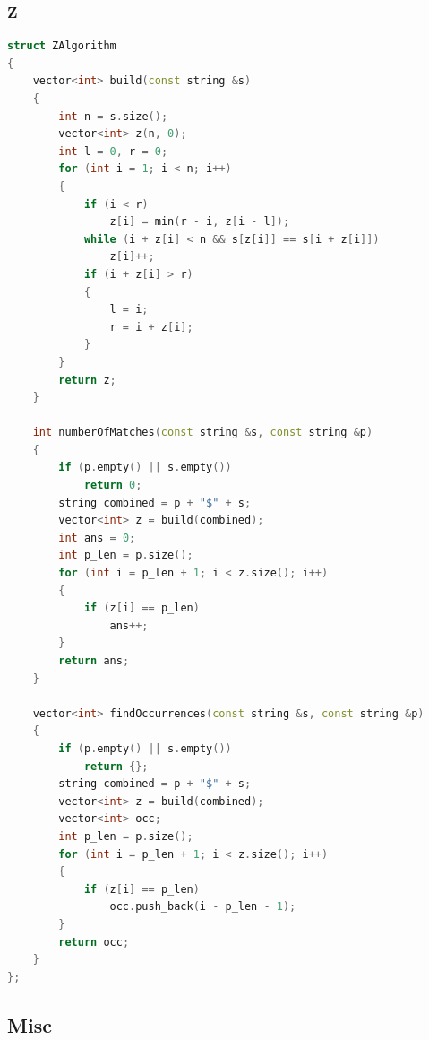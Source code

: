 \documentclass[10pt,landscape,a4paper,twocolumn]{article}
\begin{document}
\subsubsection{Z}
\begin{lstlisting}[language=C++]
struct ZAlgorithm
{
    vector<int> build(const string &s)
    {
        int n = s.size();
        vector<int> z(n, 0);
        int l = 0, r = 0;
        for (int i = 1; i < n; i++)
        {
            if (i < r)
                z[i] = min(r - i, z[i - l]);
            while (i + z[i] < n && s[z[i]] == s[i + z[i]])
                z[i]++;
            if (i + z[i] > r)
            {
                l = i;
                r = i + z[i];
            }
        }
        return z;
    }

    int numberOfMatches(const string &s, const string &p)
    {
        if (p.empty() || s.empty())
            return 0;
        string combined = p + "$" + s;
        vector<int> z = build(combined);
        int ans = 0;
        int p_len = p.size();
        for (int i = p_len + 1; i < z.size(); i++)
        {
            if (z[i] == p_len)
                ans++;
        }
        return ans;
    }

    vector<int> findOccurrences(const string &s, const string &p)
    {
        if (p.empty() || s.empty())
            return {};
        string combined = p + "$" + s;
        vector<int> z = build(combined);
        vector<int> occ;
        int p_len = p.size();
        for (int i = p_len + 1; i < z.size(); i++)
        {
            if (z[i] == p_len)
                occ.push_back(i - p_len - 1);
        }
        return occ;
    }
};

\end{lstlisting}
\subsection{Misc}
\end{document}
